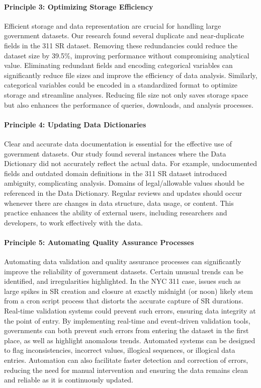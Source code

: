 \documentclass[linenumber]{jdsart}
\begin{document}
\paragraph{Principle 3: Optimizing Storage Efficiency}
Efficient storage and data representation are crucial for handling 
large government datasets. Our research found several duplicate and
near-duplicate fields in the 311 SR dataset. Removing these
redundancies could reduce the dataset size by 39.5\%, improving
performance without compromising analytical value. Eliminating 
redundant fields and encoding categorical variables can 
significantly reduce file sizes and improve the efficiency 
of data analysis. Similarly, categorical variables could be 
encoded in a standardized format to optimize storage and 
streamline analyses. Reducing file size not only saves 
storage space but also enhances the performance of queries, 
downloads,  and analysis processes.


\paragraph{Principle 4: Updating Data Dictionaries}
Clear and accurate data documentation is essential for the effective use 
of government datasets. Our study found several 
instances where the Data Dictionary did not accurately reflect the 
actual data. For example, undocumented fields and outdated domain
definitions in the 311 SR dataset introduced ambiguity, complicating
analysis. Domains of legal/allowable values should be referenced
in the Data Dictionary. Regular reviews and updates should 
occur whenever there are changes in data structure, data usage, or 
content. This practice enhances the ability of external users, 
including researchers and developers, to work 
effectively with the data.

\paragraph{Principle 5: Automating Quality Assurance Processes}
Automating data validation and quality assurance processes can 
significantly improve the reliability of government datasets. Certain
unusual trends can be identified, and irregularities highlighted. 
In the NYC 311 case, issues such as large spikes in SR 
creation and closure at exactly midnight (or noon) likely 
stem from a cron script process that distorts the 
accurate capture of SR durations. Real-time validation systems could
prevent such errors, ensuring data integrity at the point of entry. By
implementing
real-time and event-driven validation tools, governments 
can both prevent such errors from entering the dataset in the first 
place, as well as highlight anomalous trends. Automated 
systems can be designed to flag inconsistencies, incorrect values, 
illogical sequences, or illogical data entries. Automation can 
also facilitate faster detection and correction of errors, reducing 
the need for manual intervention and ensuring the data 
remains clean and reliable as it is continuously updated.
\end{document}
